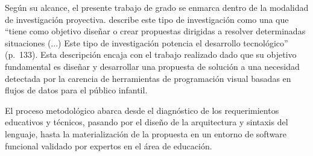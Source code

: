 
Según su alcance, el presente trabajo de grado se enmarca dentro de la modalidad de investigación proyectiva.  describe este tipo de investigación como una que “tiene como objetivo diseñar o crear propuestas dirigidas a resolver determinadas situaciones (...) Este tipo de investigación potencia el desarrollo tecnológico” (p.~133). Esta descripción encaja con el trabajo realizado dado que su objetivo fundamental es diseñar y desarrollar una propuesta de solución a una necesidad detectada por la carencia de herramientas de programación visual basadas en flujos de datos para el público infantil.

El proceso metodológico abarca desde el diagnóstico de los requerimientos educativos y técnicos, pasando por el diseño de la arquitectura y sintaxis del lenguaje, hasta la materialización de la propuesta en un entorno de software funcional validado por expertos en el área de educación.